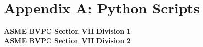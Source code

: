 \chapter{Appendix A: Python Scripts}
\label{chapt:appendixa}
\textbf{ASME BVPC Section VII Division 1}\\

\textbf{ASME BVPC Section VII Division 2}\\

